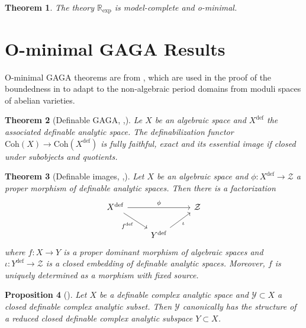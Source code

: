 \documentclass{amsart}
\newtheorem{theorem}{Theorem}[section]
\newtheorem{proposition}[theorem]{Proposition}
\theoremstyle{definition}
\numberwithin{equation}{section}
\newcommand{\definable}{\mathrm{def}}
\begin{document}
\begin{theorem}
    The theory $\mathbb{R}_{\exp}$ is model-complete and o-minimal.
\end{theorem}

\section{O-minimal GAGA Results}
O-minimal GAGA theorems are from \cite{zbMATH07662555},
which are used in the proof of the boundedness in \cite{arXiv:2507.00973,arXiv:2508.19215}
to adapt to the non-algebraic period domains from moduli spaces of abelian varieties.

\begin{theorem}[{Definable GAGA, \cite[Theorem 2.1]{arXiv:2508.19215},\cite[Theorem 1.4]{zbMATH07662555}}]
    Le $X$ be an algebraic space and $X^{\definable}$ the associated definable analytic space.
    The definabilization functor $\mathrm{Coh}(X) \to \mathrm{Coh}(X^{\definable})$ is fully faithful, exact and 
    its essential image if closed under subobjects and quotients.
\end{theorem}

\begin{theorem}[{Definable images, \cite[Theorem 2.2]{arXiv:2508.19215},\cite[Theorem 1.3]{zbMATH07662555}}]
    Let $X$ be an algebraic space and 
    $\phi: X^{\definable} \to \mathcal{Z}$ a proper morphism of definable analytic spaces.
    Then there is a factorization
    \[\begin{tikzcd}
    X^{\definable}\ar[rr,"\phi"]\ar[dr,"f^{\definable}"'] & & \mathcal{Z} \\
    & Y^{\definable}\ar[ur,"\iota"'] &
    \end{tikzcd}\]
    where $f: X\to Y$ is a proper dominant morphism of algebraic spaces and 
    $\iota: Y^{\definable} \to \mathcal{Z}$ is a closed embedding of definable analytic spaces.
    Moreover, $f$ is uniquely determined as a morphism with fixed source.
\end{theorem}

\begin{proposition}[{\cite[Proposition 2.45]{zbMATH07662555}}]
    Let $X$ be a definable complex analytic space and 
    $\mathcal{Y} \subset X$ a closed definable complex analytic subset.
    Then $\mathcal{Y}$ canonically has the structure of a reduced closed definable complex analytic subspace $Y \subset X$.
\end{proposition}
\end{document}
